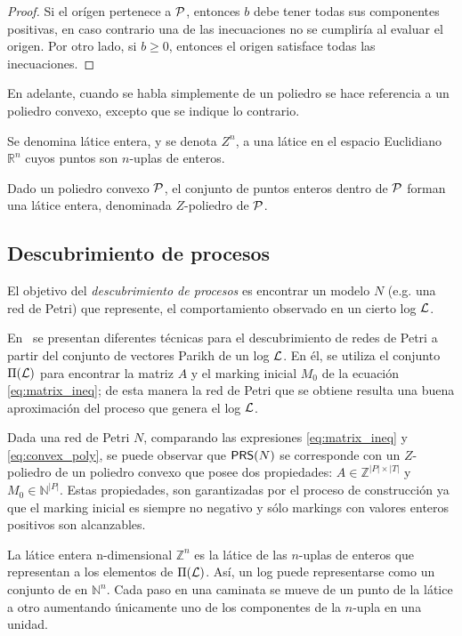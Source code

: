 \begin{proof}
    Si el orígen pertenece a ${\mathcal P}$, entonces $b$ debe tener todas sus componentes positivas,
    en caso contrario una de las inecuaciones no se cumpliría al evaluar el origen.
    Por otro lado, si $b \geq 0$, entonces el origen satisface todas las inecuaciones.
\end{proof}

En adelante, cuando se habla simplemente de un poliedro se hace referencia a un poliedro convexo,
excepto que se indique lo contrario.

Se denomina látice entera, y se denota $Z^n$, a una látice en el espacio Euclidiano $\mathbb{R}^n$
cuyos puntos son $n$-uplas de enteros. 

Dado un poliedro convexo ${\mathcal P}$, el conjunto de puntos enteros dentro de ${\mathcal P}$
forman una látice entera, denominada $Z$-poliedro de ${\mathcal P}$.

\subsection{Descubrimiento de procesos} 
\label{sec:2.discovery discovery}

El objetivo del \textit{descubrimiento de procesos} es encontrar un 
modelo $N$ (e.g. una red de Petri) que represente, el comportamiento 
observado en un cierto log ${\mathcal L}$.

En~\cite{CarmonaC14} se presentan diferentes técnicas 
para el descubrimiento de redes de Petri a partir del 
conjunto de vectores Parikh de un log ${\mathcal L}$.
En él, se utiliza el conjunto $\Pi({\mathcal L})$ para encontrar
la matriz $A$ y el marking inicial $M_0$ de la ecuación \eqref{eq:matrix_ineq};
de esta manera la red de Petri que se obtiene resulta 
una buena aproximación del proceso que genera el log ${\mathcal L}$.

Dada una red de Petri $N$, comparando las expresiones \eqref{eq:matrix_ineq}
y \eqref{eq:convex_poly}, se puede observar que $\textsf{PRS}(N)$ se corresponde con
un $Z$-poliedro de un poliedro convexo que posee dos propiedades:
\mbox{$A \in \mathbb{Z}^{|P|\times|T|}$} y \mbox{$M_0 \in \mathbb{N}^{|P|}$}.
Estas propiedades, son garantizadas por el proceso de construcción ya que el
marking inicial es siempre no negativo y sólo markings con valores enteros positivos
son alcanzables.


La látice entera n-dimensional $\mathbb{Z}^n$ es la látice de las $n$-uplas
de enteros que representan a los elementos de $\Pi({\mathcal L})$. Así, un log 
puede representarse como un conjunto de  en $\mathbb{N}^n$. Cada paso 
en una caminata se mueve de un punto de la látice a otro aumentando únicamente uno de
los componentes de la $n$-upla en una unidad.

